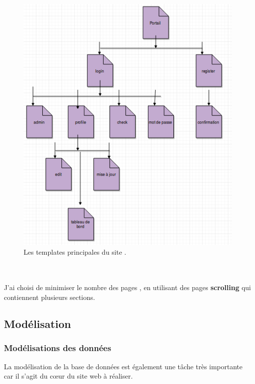 \documentclass[12pt]{article}
\begin{document}
\begin{center}
\begin{figure}[htp]
  \centering
  \includegraphics[width=12cm]{p3.png}
  \caption{Les templates principales du site  .}
  \label{fig:une-autre-image}
\end{figure}

\end{center}

\\ \\
J'ai choisi de minimiser le nombre des pages  , en utilisant des pages
\textbf{scrolling} qui contiennent plusieurs sections.







\subsection{Modélisation}
\subsubsection{Modélisations des données}




La modélisation de la base de données est également une tâche très importante car il s’agit
du cœur du site web à réaliser. \\ 
\end{document}
